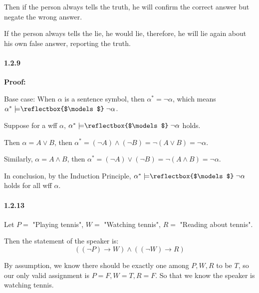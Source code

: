 \documentclass[11pt]{article}
\newcommand{\rmodels}{%
  \mathrel{\text{\reflectbox{$\models$}}}%
}
\begin{document}
		Then if the person always tells the truth, he will confirm the correct answer but negate the wrong answer.
		
		If the person always tells the lie, he would lie, therefore, he will lie again about his own false answer, reporting the truth.
		
		\paragraph{1.2.9}
		\textbf{Proof:} 
		
		Base case: When $\alpha$ is a sentence symbol, then $\alpha^* = \neg \alpha$, which means $\alpha^* \models \rmodels \neg \alpha$.
		
		Suppose for a wff $\alpha$, $\alpha^* \models \rmodels \neg \alpha$ holds.
		
		Then $\alpha = A \vee B$, then $\alpha^* = (\neg A) \wedge (\neg B) = \neg (A \vee B) = \neg \alpha$.
		
		Similarly, $\alpha = A \wedge B$, then $\alpha^* = (\neg A) \vee (\neg B) = \neg (A \wedge B) = \neg \alpha$.
		
		In conclusion, by the Induction Principle, $\alpha^* \models \rmodels \neg \alpha$ holds for all wff $\alpha$.
		
		\paragraph{1.2.13}
		Let $P = $ "Playing tennis", $W = $ "Watching tennis", $R = $ "Reading about tennis".
		
		Then the statement of the speaker is: $$((\neg P) \rightarrow W) \wedge ((\neg W) \rightarrow R)$$
		
		By assumption, we know there should be exactly one among $P, W, R$ to be $T$, so our only valid assignment is $P = F, W = T, R = F$. So that we know the speaker is watching tennis.
\end{document}
